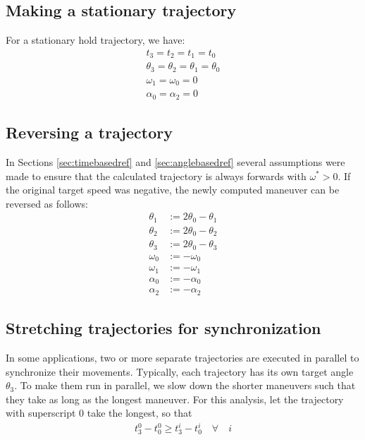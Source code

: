 \documentclass[12pt, a4paper]
{article}
\providecommand{\w}{\omega}
\providecommand{\wt}{\w^*}
\renewcommand{\th}{\theta}
\renewcommand{\a}{\alpha}
\begin{document}
\subsection{Making a stationary trajectory}
\label{sec:stationary}
For a stationary hold trajectory, we have:
%
\begin{align}
    t_3 = t_2 = t_1 = t_0 \\[1em]
    \th_3 = \th_2 = \th_1 = \th_0 \\[1em]
    \w_1 = \w_0 = 0 \\[1em]
    \a_0 = \a_2 = 0
\end{align}


\subsection{Reversing a trajectory}
\label{sec:invert}
In Sections \ref{sec:timebasedref} and \ref{sec:anglebasedref} several
assumptions were made to ensure that the calculated trajectory is always
forwards with $\wt > 0$. If the original target speed was negative, the
newly computed maneuver can be reversed as follows:
%
\begin{align}
    \th_1 &:= 2 \th_0 - \th_1\\[1em]
    \th_2 &:= 2 \th_0 - \th_2\\[1em]
    \th_3 &:= 2 \th_0 - \th_3\\[1em]
    \w_0 &:= -\w_0\\[1em]
    \w_1 &:= -\w_1\\[1em]
    \a_0 &:= -\a_0\\[1em]
    \a_2 &:= -\a_2
\end{align}

\subsection{Stretching trajectories for synchronization}

In some applications, two or more separate trajectories are executed in
parallel to synchronize their movements. Typically, each trajectory has its own
target angle $\th_3$. To make them run in parallel, we slow down the shorter
maneuvers such that they take as long as the longest maneuver. For this
analysis, let the trajectory with superscript $0$ take the longest, so that
%
\begin{align}
    t^0_3 - t^0_0 \geq t^i_3 - t^i_0  \quad \forall \quad i
\end{align}
\end{document}
